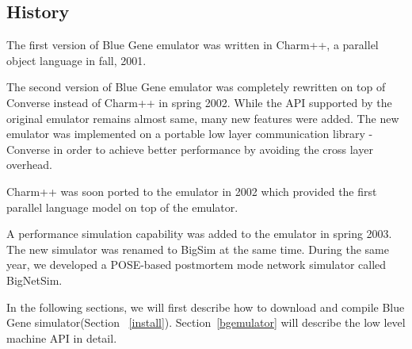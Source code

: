 \documentclass[10pt]{article}
\begin{document}
\subsection{History}

The first version of Blue Gene emulator was written in Charm++, a 
parallel object language in fall, 2001. 

The second version of Blue Gene emulator was completely rewritten on top 
of Converse instead of Charm++ in spring 2002. 
While the API supported by the original emulator remains almost same,
many new features were added.
The new emulator was implemented on a portable low layer communication 
library - Converse in order to achieve better 
performance by avoiding the cross layer overhead.

Charm++ was soon ported to the emulator in 2002 which provided the
 first parallel language model on top of the emulator.

A performance simulation capability was added to the emulator in spring 2003.
The new simulator was renamed to BigSim at the same time.
During the same year, we developed a POSE-based postmortem mode network
simulator called BigNetSim.


In the following sections, we will first describe how to download and compile
Blue Gene simulator(Section ~\ref{install}). Section~\ref{bgemulator} will describe
the low level machine API in detail. 









\end{document}
